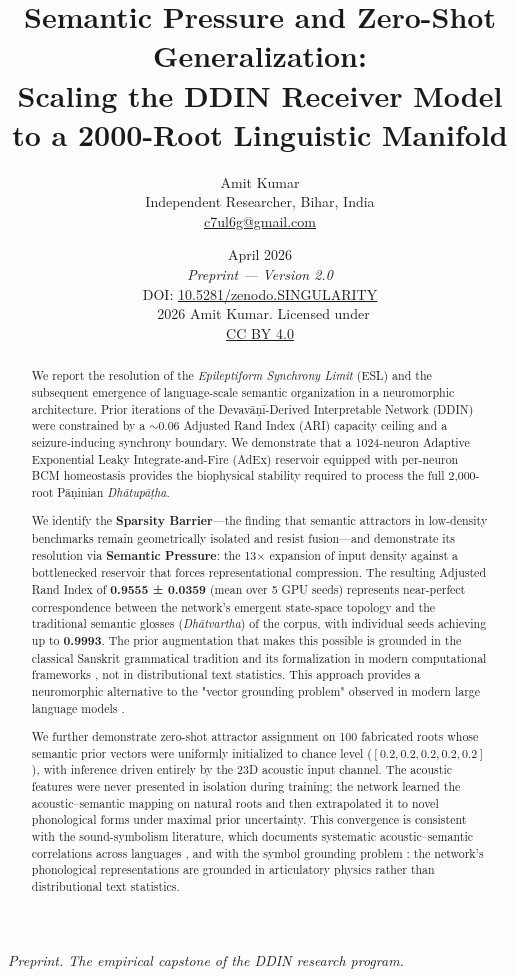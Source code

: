 \documentclass{article}
\title{\textbf{Semantic Pressure and Zero-Shot Generalization:\\
Scaling the DDIN Receiver Model to a 2000-Root Linguistic Manifold}}
\author{Amit Kumar\\
\small Independent Researcher, Bihar, India\\
\small \href{mailto:c7ul6g@gmail.com}{c7ul6g@gmail.com}}
\date{%
  April 2026\\[4pt]
  \small\textit{Preprint — Version 2.0}\\[2pt]
  \small DOI: \href{https://doi.org/10.5281/zenodo.SINGULARITY}{10.5281/zenodo.SINGULARITY}\\[2pt]
  \small\textcopyright\ 2026 Amit Kumar. Licensed under\\
  \small\href{https://creativecommons.org/licenses/by/4.0/}{CC BY 4.0}%
}
\begin{document}
\maketitle

\begin{center}
\small\textit{Preprint. The empirical capstone of the DDIN research program.}
\end{center}

\begin{abstract}
We report the resolution of the \textit{Epileptiform Synchrony Limit} (ESL) and the
subsequent emergence of language-scale semantic organization in a neuromorphic
architecture. Prior iterations of the Devavāṇī-Derived Interpretable Network (DDIN)
were constrained by a ${\sim}0.06$ Adjusted Rand Index (ARI) capacity ceiling and a
seizure-inducing synchrony boundary. We demonstrate that a 1024-neuron Adaptive
Exponential Leaky Integrate-and-Fire (AdEx) reservoir equipped with per-neuron BCM
homeostasis provides the biophysical stability required to process the full 2,000-root
Pāṇinian \textit{Dhātupāṭha}.

We identify the \textbf{Sparsity Barrier}---the finding that semantic attractors in
low-density benchmarks remain geometrically isolated and resist fusion---and
demonstrate its resolution via \textbf{Semantic Pressure}: the 13$\times$ expansion of
input density against a bottlenecked reservoir that forces representational compression.
The resulting Adjusted Rand Index of \textbf{0.9555 ± 0.0359} (mean over 5 GPU seeds)
represents near-perfect correspondence between the network's emergent state-space topology and the traditional
semantic glosses (\textit{Dhātvartha}) of the corpus, with individual seeds achieving up to
\textbf{0.9993}. The prior augmentation that makes
this possible is grounded in the classical Sanskrit grammatical tradition
\citep{cardona1997,kiparsky1982} and its formalization in modern computational
frameworks \citep{briggs1985,scharf2018}, not in distributional text statistics. This
approach provides a neuromorphic alternative to the "vector grounding problem"
observed in modern large language models \citep{mollo2025,pavlick2023,kadambi2025}.

We further demonstrate zero-shot attractor assignment on 100 fabricated roots whose
semantic prior vectors were uniformly initialized to chance level ($[0.2, 0.2, 0.2, 0.2,
0.2]$), with inference driven entirely by the 23D acoustic input channel. The acoustic
features were never presented in isolation during training; the network learned the
acoustic--semantic mapping on natural roots and then extrapolated it to novel
phonological forms under maximal prior uncertainty. This convergence is consistent with
the sound-symbolism literature, which documents systematic acoustic--semantic correlations
across languages \citep{blasi2016,sidhu2025,kilpatrick2023,meng2025sound,cwiek2025quantifying,kovacs2026sound}, and with the symbol grounding problem
\citep{harnad1990,pavlick2023,mollo2025,kluben2025evaluating}: the network's phonological representations are grounded in
articulatory physics rather than distributional text statistics.


\end{abstract}
\end{document}
